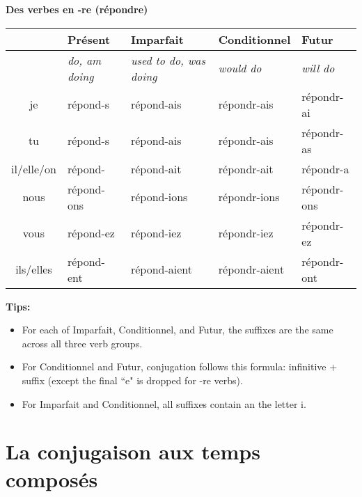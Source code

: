 \vskip 0.5cm
\renewcommand{\stemPresent}{r\'epond}
\renewcommand{\stemFutur}{r\'epondr}
\begin{center}
\textbf{Des verbes en -re (r\'epondre)}
\vskip 0.1cm
\begin{tabular}{|c||L{3cm}|L{3cm}|L{3cm}|L{3cm}|}
\hline
& Pr\'esent & Imparfait & Conditionnel & Futur \\
\hline
& \textit{do, am doing} & \textit{used to do, was doing} & \textit{would do} & \textit{will do} \\
\hline\hline
je           &	\stemPresent-s 	&	\stemPresent-ais	&	\stemFutur-ais	 &	\stemFutur-ai	\\
tu           &	\stemPresent-s	&	\stemPresent-ais	&	\stemFutur-ais	&	\stemFutur-as	\\
il/elle/on &	\stemPresent-	&	\stemPresent-ait	&	\stemFutur-ait	&	\stemFutur-a	\\
nous      &	\stemPresent-ons	&	\stemPresent-ions	&	\stemFutur-ions	&	\stemFutur-ons	\\
vous      &	\stemPresent-ez	&	\stemPresent-iez	&	\stemFutur-iez		&	\stemFutur-ez	\\
ils/elles  &	\stemPresent-ent	&	\stemPresent-aient	&	\stemFutur-aient	&	\stemFutur-ont	\\
\hline
\end{tabular}
\end{center}

\vskip 0.3cm
{\scriptsize
\noindent
\textbf{Tips:}
\begin{itemize}
\item	For each of Imparfait, Conditionnel, and Futur, the suffixes are the same across all three verb groups.
\item	For Conditionnel and Futur, conjugation follows this formula: infinitive + suffix (except the final ``e" is dropped for -re verbs).
\item	For {\color{red}I}mparfait and Cond{\color{red}i}tionnel, all suffixes contain an the letter {\color{red}i}. 
\end{itemize}
}

\clearpage
\section{La conjugaison aux temps compos\'es}
\setcounter{theorem}{0}
\setcounter{equation}{0}

